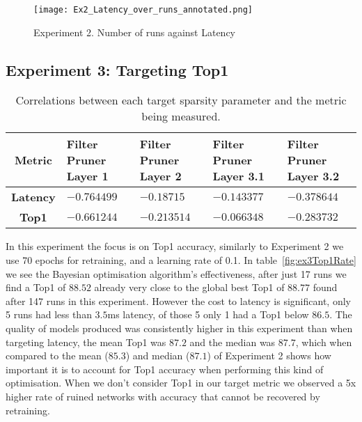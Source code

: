 \documentclass[../Dissertation.tex]{subfiles}
\begin{document}
\begin{figure}[H]
    \centering
    \texttt{[image: Ex2\_Latency\_over\_runs\_annotated.png]}
    \caption{Experiment 2. Number of runs against Latency}
\end{figure}

\subsection{Experiment 3: Targeting Top1}

\singlespacing
\begin{table}[H]
    \centering
    \begin{tabular}{@{}cp{26mm}p{26mm}p{26mm}p{26mm}@{}}
    \toprule
    \textbf{Metric}  & \textbf{Filter Pruner  Layer 1} & \textbf{Filter Pruner Layer 2} & \textbf{Filter Pruner Layer 3.1} & \textbf{Filter Pruner Layer 3.2} \\ \midrule
    \textbf{Latency} & $-0.764499$                        & $-0.18715$                      & $-0.143377$                         & $-0.378644$                         \\
    \textbf{Top1}    & $-0.661244$                        & $-0.213514$                      & $-0.066348$                        & $-0.283732$                        \\ \bottomrule
    \end{tabular}
    \caption{Correlations between each target sparsity parameter and the metric being measured.}
    \label{tab:Ex3PruneCorrelations}
\end{table}
\doublespacing

In this experiment the focus is on Top1 accuracy, similarly to Experiment 2 we use 70 epochs for retraining, and a learning rate of 0.1. 
In table~\ref{fig:ex3Top1Rate} we see the Bayesian optimisation algorithm's effectiveness, after just 17 runs we find a Top1 of $88.52$ already very close to the global best Top1 of $88.77$ found after 147 runs in this experiment.
However the cost to latency is significant, only 5 runs had less than $3.5$ms latency, of those 5 only 1 had a Top1 below $86.5$.
The quality of models produced was consistently higher in this experiment than when targeting latency, the mean Top1 was $87.2$ and the median was $87.7$, which when compared to the mean ($85.3$) and median ($87.1$) of Experiment 2 shows how important it is to account for Top1 accuracy when performing this kind of optimisation.
When we don't consider Top1 in our target metric we observed a 5x higher rate of ruined networks with accuracy that cannot be recovered by retraining.
\end{document}
